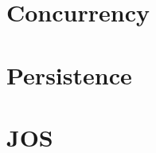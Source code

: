 \documentclass[12pt, letterpaper]{article}
\begin{document}
			
\newpage	\section{Concurrency}
	
	\section{Persistence}
	
	\section{JOS}
\end{document}
